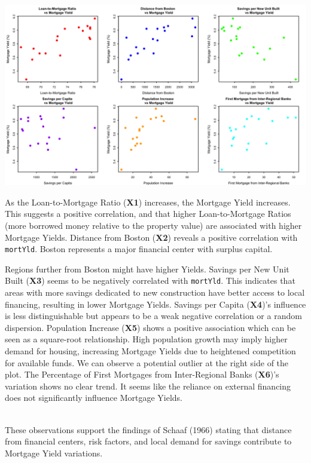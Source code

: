 \documentclass[
  11pt,
]{article}
\begin{document}
\begin{minipage}{0.5\textwidth}
\includegraphics[width=1.5\linewidth]{6plots_summary.png}
\end{minipage}
\hfill
\begin{minipage}{0.25\textwidth}
\small
As the Loan-to-Mortgage Ratio (\textbf{X1}) increases, the Mortgage Yield increases. This suggests a positive correlation, and that higher Loan-to-Mortgage Ratios (more borrowed money relative to the property value) are associated with higher Mortgage Yields. Distance from Boston (\textbf{X2}) reveals a positive correlation with \texttt{mortYld}. Boston represents a major financial center with surplus capital.
\end{minipage}

Regions further from Boston might have higher Yields. Savings per New
Unit Built (\textbf{X3}) seems to be negatively correlated with
\texttt{mortYld}. This indicates that areas with more savings dedicated
to new construction have better access to local financing, resulting in
lower Mortgage Yields. Savings per Capita (\textbf{X4})'s influence is
less distinguishable but appears to be a weak negative correlation or a
random dispersion. Population Increase (\textbf{X5}) shows a positive
association which can be seen as a square-root relationship. High
population growth may imply higher demand for housing, increasing
Mortgage Yields due to heightened competition for available funds. We
can observe a potential outlier at the right side of the plot. The
Percentage of First Mortgages from Inter-Regional Banks (\textbf{X6})'s
variation shows no clear trend. It seems like the reliance on external
financing does not significantly influence Mortgage Yields.\\
\strut \\
These observations support the findings of Schaaf (1966) stating that
distance from financial centers, risk factors, and local demand for
savings contribute to Mortgage Yield variations.
\end{document}
